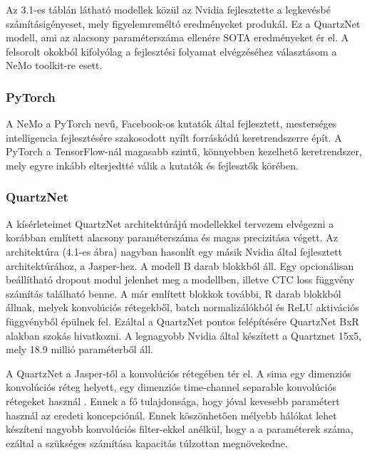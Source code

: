 Az 3.1-es táblán látható modellek közül az Nvidia fejlesztette a legkevésbé számításigényeset, mely figyelemreméltó eredményeket produkál. Ez a QuartzNet modell, ami az alacsony paraméterszáma ellenére SOTA eredményeket ér el. A felsorolt okokból kifolyólag a fejlesztési folyamat elvégzéséhez választásom a NeMo toolkit-re esett.

\subsubsection{PyTorch}

A NeMo a PyTorch nevű, Facebook-os kutatók által fejlesztett, mesterséges intelligencia fejlesztésére szakosodott nyílt forráskódú keretrendszerre épít. A PyTorch a TensorFlow-nál magasabb szintű, könnyebben kezelhető keretrendszer, mely egyre inkább elterjedtté válik a kutatók és fejlesztők körében.

\subsubsection{QuartzNet}

A kísérleteimet QuartzNet architektúrájú modellekkel tervezem elvégezni a korábban említett alacsony paraméterszáma és magas precizitása végett. Az architektúra (4.1-es ábra) nagyban hasonlít egy másik Nvidia által fejlesztett architektúrához, a Jasper-hez. A modell B darab blokkból áll. Egy opcionálisan beállítható dropout modul jelenhet meg a modellben, illetve CTC loss függvény számítás található benne. A már említett blokkok további, R darab blokkból állnak, melyek konvolúciós rétegekből, batch normalizálókból és ReLU aktivációs függvényből épülnek fel. Ezáltal a QuartzNet pontos felépítésére QuartzNet BxR alakban szokás hivatkozni. A legnagyobb Nvidia által készített a Quartznet 15x5, mely 18.9 millió paraméterből áll.

A QuartzNet a Jasper-től a konvolúciós rétegében tér el. A sima egy dimenziós konvolúciós réteg helyett, egy dimenziós time-channel separable konvolúciós rétegeket használ \cite{quartznet}. Ennek a fő tulajdonsága, hogy jóval kevesebb paramétert használ az eredeti koncepciónál. Ennek köszönhetően mélyebb hálókat lehet készíteni nagyobb konvolúciós filter-ekkel anélkül, hogy a a paraméterek száma, ezáltal a szükséges számítása kapacitás túlzottan megnövekedne.

